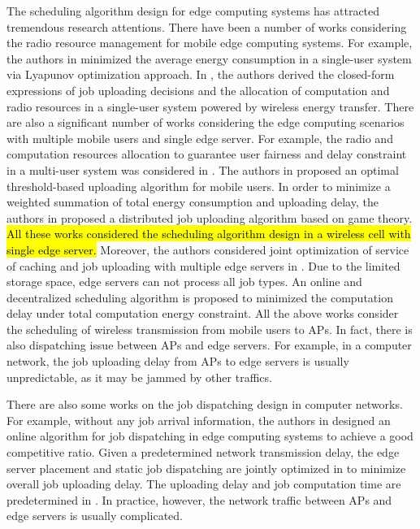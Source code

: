 {    The scheduling algorithm design for edge computing systems has attracted tremendous research attentions.
    There have been a number of works considering the radio resource management for mobile edge computing systems.
    For example, the authors in \text{[1]} minimized the average energy consumption in a single-user system via Lyapunov optimization approach.
    In \text{[2]}, the authors derived the closed-form expressions of job uploading decisions and the allocation of computation and radio resources in a single-user system powered by wireless energy transfer.
    There are also a significant number of works considering the edge computing scenarios with multiple mobile users and single edge server.
        For example, the radio and computation resources allocation to guarantee user fairness and delay constraint in a multi-user system was considered in \text{[3]}.
        The authors in \text{[4]} proposed an optimal threshold-based uploading algorithm for mobile users.
        In order to minimize a weighted summation of total energy consumption and uploading delay, the authors in \text{[5]} proposed a distributed job uploading algorithm based on game theory.
        \hl{All these works considered the scheduling algorithm design in a wireless cell with single edge server.}
    Moreover, the authors considered joint optimization of service of caching and job uploading with multiple edge servers in \text{[6]}. Due to the limited storage space, edge servers can not process all job types.
    An online and decentralized scheduling algorithm is proposed to minimized the computation delay under total computation energy constraint.
    All the above works consider the scheduling of wireless transmission from mobile users to APs. In fact, there is also dispatching issue between APs and edge servers.
    For example, in a computer network, the job uploading delay from APs to edge servers is usually unpredictable, as it may be jammed by other traffics.

    There are also some works on the job dispatching design in computer networks.
    For example, without any job arrival information, the authors in \text{[7]} designed an online algorithm for job dispatching in edge computing systems to achieve a good competitive ratio.
    Given a predetermined network transmission delay, the edge server placement and static job dispatching are jointly optimized in \text{[8]} to minimize overall job uploading delay. The uploading delay and job computation time are predetermined in \text{[7,8]}.
    In practice, however, the network traffic between APs and edge servers is usually complicated.
}

